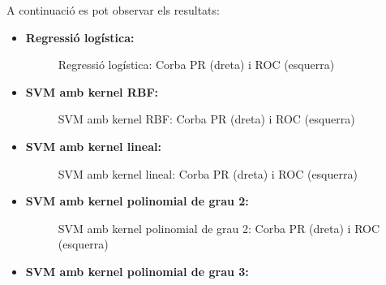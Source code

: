 \documentclass[a4paper, 11pt]{article}
\begin{document}
    A continuació es pot observar els resultats:
        \begin{itemize}
            \item \textbf{Regressió logística:}


                \begin{figure}[H]%
                \centering
                \qquad
                \caption*{Regressió logística: Corba PR (dreta) i ROC (esquerra)}
                \end{figure}

            \item \textbf{SVM amb kernel RBF:}


                \begin{figure}[H]%
                \centering
                \qquad
                \caption*{SVM amb kernel RBF: Corba PR (dreta) i ROC (esquerra)}
                \end{figure}

            \newpage
            \item \textbf{SVM amb kernel lineal:}


                \begin{figure}[H]%
                \centering
                \qquad
                \caption*{SVM amb kernel lineal: Corba PR (dreta) i ROC (esquerra)}
                \end{figure}


            \item \textbf{SVM amb kernel polinomial de grau 2:}


                \begin{figure}[H]%
                \centering
                \qquad
                \caption*{SVM amb kernel polinomial de grau 2: Corba PR (dreta) i ROC (esquerra)}
                \end{figure}


            \item \textbf{SVM amb kernel polinomial de grau 3:}



\end{itemize}
\end{document}
